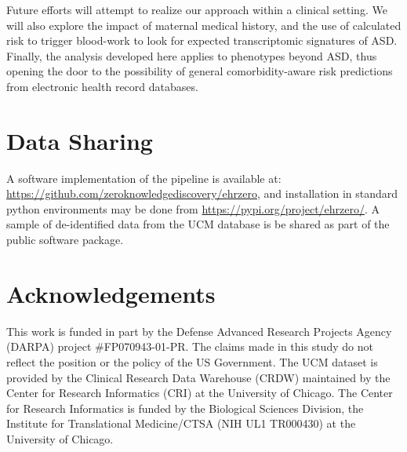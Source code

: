 \documentclass[3p,super,numbers,sort&compress,preprint,10pt]{elsarticle}
\begin{document}
Future efforts will attempt to realize our approach within a clinical setting. We will also explore the impact of  maternal medical history, and the  use of calculated risk to trigger   blood-work to look for expected  transcriptomic  signatures of ASD. Finally,  the analysis developed here applies to phenotypes beyond ASD, thus opening the door to the possibility of  general  comorbidity-aware risk predictions  from electronic health record databases.



\section*{Data Sharing} A software implementation of the pipeline is available at: \href{https://github.com/zeroknowledgediscovery/ehrzero}{https://github.com/zeroknowledgediscovery/ehrzero}, and installation in standard python environments
may be done from \href{https://pypi.org/project/ehrzero/}{https://pypi.org/project/ehrzero/}.
A sample of de-identified data
from the UCM database is be shared as part of the public software package.

\section*{Acknowledgements}
This work is funded in part by the Defense Advanced Research Projects Agency (DARPA) project \#FP070943-01-PR. The claims made in this study  do not  reflect the position or the policy of the US Government. The UCM dataset is provided by the Clinical Research Data Warehouse (CRDW) maintained by the Center for Research Informatics (CRI) at the  University of Chicago. The Center for Research Informatics is funded by the Biological Sciences Division, the Institute for Translational Medicine/CTSA (NIH UL1 TR000430) at the University of Chicago. 



% 
 
\end{document}

